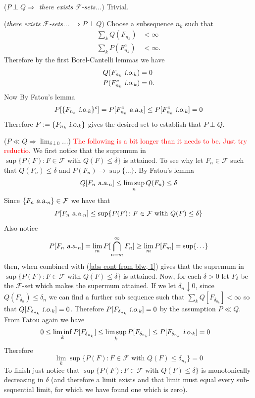 \begin{exerciseproof}
({\sl $P\perp Q \Longrightarrow $ there exists $\mathcal F$-sets...}) Trivial.


({\sl  there exists $\mathcal F$-sets... $\Longrightarrow P\perp Q  $}) Choose a subsequence $n_k$ such that
\begin{align*}
\textstyle\sum_k Q(F_{n_k}) &< \infty \\
\textstyle\sum_k P(F^c_{n_k}) &< \infty.
\end{align*}
Therefore by the first Borel-Cantelli lemmas we have
\begin{align*}
Q(F_{n_k} {\,\,\text{\sl i.o.} }_k) & =  0 \\
P(F^c_{n_k}{\,\,\text{\sl i.o.} }_k) & =  0.
\end{align*}
Now By Fatou's lemma
\[ P[\{F_{n_k}{\,\,\text{\sl i.o.} }_k\}^c] = P[F^c_{n_k}{\,\,\text{\sl a.a.} }_k ] \leq P[F^c_{n_k}{\,\,\text{\sl i.o.} }_k ] =0 \]
Therefore $F:=\{F_{n_k}{\,\,\text{\sl i.o.} }_k\}$ gives the desired set to establish that $P\perp Q$.

({\sl $P\ll Q \Longrightarrow \lim_{\delta\downarrow 0}$...}) \textcolor{red}{The following is a bit longer than it needs to be. Just try reductio.}
We first notice that the supremum in $\sup\{ P(F)\colon \text{$F\in \mathcal F$ with $Q(F)\leq \delta$}\}$ is attained. To see why let $F_n\in \mathcal F$ such that $Q(F_n)\leq \delta$ and $P(F_n)\rightarrow \sup\{\ldots\}$. By Fatou's lemma
\[
Q[F_n {\,\,\text{\sl a.a.} }_n]\leq \limsup_n Q(F_n)\leq \delta
\]
Since  $\{F_n {\,\,\text{\sl a.a.} }_n\}\in \mathcal F$ we have that
\begin{equation}
\label{abs cont from blw, 1}
P[F_n {\,\,\text{\sl a.a.} }_n] \leq \sup\{ P(F)\colon \text{$F\in \mathcal F$ with $Q(F)\leq \delta$}\}
\end{equation}
Also notice
\[
P[F_n {\,\,\text{\sl a.a.} }_n] =  \lim_m P[\bigcap_{n=m}^\infty F_n]\geq \lim_m P[ F_m] =\sup\{\ldots\}
\]
then, when combined with (\ref{abs cont from blw, 1}) gives that the supremum in $\sup\{ P(F)\colon \text{$F\in \mathcal F$ with $Q(F)\leq \delta$}\}$ is attained. Now, for each $\delta> 0$ let $F_\delta$  be the $\mathcal F$-set
 which makes the supermum attained. If we let $\delta_n \downarrow 0$, since $Q(F_{\delta_n})\leq \delta_{n}$ we can find a further sub sequence such that $\sum_k Q[F_{\delta_{n_k}}]<\infty$ so that $Q[F_{\delta_{n_k}} {\,\,\text{\sl i.o.} }_k]=0$. Therefore $P[F_{\delta_{n_k}} {\,\,\text{\sl i.o.} }_k]=0$ by the assumption $P\ll Q$. From Fatou again we have
 \begin{align*}
 0 &\leq \liminf_k P[F_{\delta_{n_k}}]\leq \limsup_k P[F_{\delta_{n_k}}]\leq P[F_{\delta_{n_k}} {\,\,\text{\sl i.o.} }_k]=0
 \end{align*}
Therefore
\[
\lim_k \sup\{ P(F)\colon \text{$F\in \mathcal F$ with $Q(F)\leq \delta_{n_k}$}\}  =0
\]
To finish just notice that $\sup\{ P(F)\colon \text{$F\in \mathcal F$ with $Q(F)\leq \delta$}\}$ is monotonically decreasing in $\delta$ (and therefore a limit exists and that limit must equal every sub-sequential limit, for which we have found one which is zero).




\end{exerciseproof}
